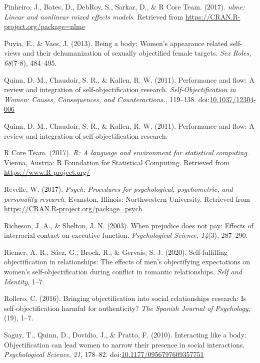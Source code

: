 \documentclass[man]{apa6}
\begin{document}
\hypertarget{ref-R-nlme}{}
Pinheiro, J., Bates, D., DebRoy, S., Sarkar, D., \& R Core Team. (2017).
\emph{nlme: Linear and nonlinear mixed effects models}. Retrieved from
\url{https://CRAN.R-project.org/package=nlme}

\hypertarget{ref-puvia2013being}{}
Puvia, E., \& Vaes, J. (2013). Being a body: Women's appearance related
self-views and their dehumanization of sexually objectified female
targets. \emph{Sex Roles}, \emph{68}(7-8), 484--495.

\hypertarget{ref-quinnetal}{}
Quinn, D. M., Chaudoir, S. R., \& Kallen, R. W. (2011). Performance and
flow: A review and integration of self-objectification research.
\emph{Self-Objectification in Women: Causes, Consequences, and
Counteractions.}, 119--138.
doi:\href{https://doi.org/10.1037/12304-006}{10.1037/12304-006}

\hypertarget{ref-quinn2011performance}{}
Quinn, D. M., Chaudoir, S. R., \& Kallen, R. W. (2011). Performance and
flow: A review and integration of self-objectification research.

\hypertarget{ref-R-base}{}
R Core Team. (2017). \emph{R: A language and environment for statistical
computing}. Vienna, Austria: R Foundation for Statistical Computing.
Retrieved from \url{https://www.R-project.org/}

\hypertarget{ref-R-psych}{}
Revelle, W. (2017). \emph{Psych: Procedures for psychological,
psychometric, and personality research}. Evanston, Illinois:
Northwestern University. Retrieved from
\url{https://CRAN.R-project.org/package=psych}

\hypertarget{ref-richeson2003prejudice}{}
Richeson, J. A., \& Shelton, J. N. (2003). When prejudice does not pay:
Effects of interracial contact on executive function.
\emph{Psychological Science}, \emph{14}(3), 287--290.

\hypertarget{ref-riemer2020self}{}
Riemer, A. R., Sáez, G., Brock, R., \& Gervais, S. J. (2020).
Self-fulfilling objectification in relationships: The effects of men's
objectifying expectations on women's self-objectification during
conflict in romantic relationships. \emph{Self and Identity}, 1--7.

\hypertarget{ref-rollero2016bringing}{}
Rollero, C. (2016). Bringing objectification into social relationships
research: Is self-objectification harmful for authenticity? \emph{The
Spanish Journal of Psychology}, (19), 1--7.

\hypertarget{ref-saguyetal2010}{}
Saguy, T., Quinn, D., Dovidio, J., \& Pratto, F. (2010). Interacting
like a body: Objectification can lead women to narrow their presence in
social interactions. \emph{Psychological Science}, \emph{21}, 178--82.
doi:\href{https://doi.org/10.1177/0956797609357751}{10.1177/0956797609357751}
\end{document}
